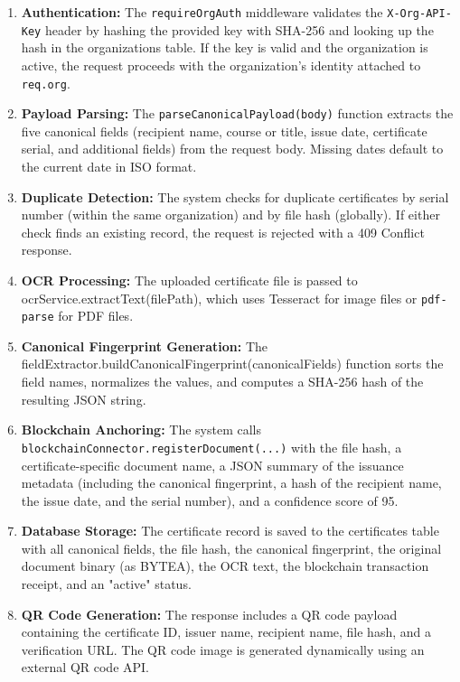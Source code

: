 \begin{enumerate}
    \item \textbf{Authentication:} The \texttt{requireOrgAuth} middleware validates the \texttt{X-Org-API-Key} header by hashing the provided key with SHA-256 and looking up the hash in the organizations table. If the key is valid and the organization is active, the request proceeds with the organization's identity attached to \texttt{req.org}.
    \item \textbf{Payload Parsing:} The \texttt{parseCanonicalPayload(body)} function extracts the five canonical fields (recipient name, course or title, issue date, certificate serial, and additional fields) from the request body. Missing dates default to the current date in ISO format.
    \item \textbf{Duplicate Detection:} The system checks for duplicate certificates by serial number (within the same organization) and by file hash (globally). If either check finds an existing record, the request is rejected with a 409 Conflict response.
    \item \textbf{OCR Processing:} The uploaded certificate file is passed to {ocrService.extractText(filePath)}, which uses Tesseract for image files or \texttt{pdf-parse} for PDF files.
    \item \textbf{Canonical Fingerprint Generation:} The {fieldExtractor.buildCanonicalFingerprint(canonicalFields)} function sorts the field names, normalizes the values, and computes a SHA-256 hash of the resulting JSON string.
    \item \textbf{Blockchain Anchoring:} The system calls \texttt{blockchainConnector.registerDocument(...)} with the file hash, a certificate-specific document name, a JSON summary of the issuance metadata (including the canonical fingerprint, a hash of the recipient name, the issue date, and the serial number), and a confidence score of 95.
    \item \textbf{Database Storage:} The certificate record is saved to the certificates table with all canonical fields, the file hash, the canonical fingerprint, the original document binary (as BYTEA), the OCR text, the blockchain transaction receipt, and an "active" status.
    \item \textbf{QR Code Generation:} The response includes a QR code payload containing the certificate ID, issuer name, recipient name, file hash, and a verification URL. The QR code image is generated dynamically using an external QR code API.
\end{enumerate}


